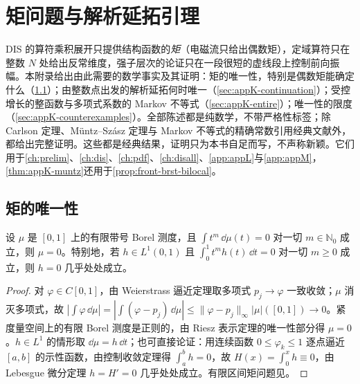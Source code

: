 \chapter{矩问题与解析延拓引理}\label{app:appK}

DIS 的算符乘积展开只提供结构函数的\emph{矩}（电磁流只给出偶数矩），定域算符只在整数 $N$ 处给出反常维度，强子层次的论证只在一段很短的虚线段上控制前向振幅。本附录给出由此需要的数学事实及其证明：矩的唯一性，特别是偶数矩能确定什么（\cref{sec:appK-hausdorff}）；由整数点出发的解析延拓何时唯一（\cref{sec:appK-continuation}）；受控增长的整函数与多项式系数的 Markov 不等式（\cref{sec:appK-entire}）；唯一性的限度（\cref{sec:appK-counterexamples}）。全部陈述都是纯数学，不带严格性标签；除 Carlson 定理、Müntz--Szász 定理与 Markov 不等式的精确常数引用经典文献外，都给出完整证明。这些都是经典结果，证明只为本书自足而写，不声称新颖。它们用于\cref{ch:prelim}、\cref{ch:dis}、\cref{ch:pdf}、\cref{ch:disall}、\cref{app:appL}与\cref{app:appM}，\cref{thm:appK-muntz}还用于\cref{prop:front-brst-bilocal}。

\section{矩的唯一性}\label{sec:appK-hausdorff}

\begin{lemma}\label{lem:appK-hausdorff}
设 $\mu$ 是 $[0,1]$ 上的有限带号 Borel 测度，且 $\int t^m\,\dd\mu(t)=0$ 对一切 $m\in\mathbb N_0$ 成立，则 $\mu=0$。特别地，若 $h\in L^1(0,1)$ 且 $\int_0^1t^mh(t)\,\dd t=0$ 对一切 $m\ge0$ 成立，则 $h=0$ 几乎处处成立。
\end{lemma}

\begin{proof}
对 $\varphi\in C[0,1]$，由 Weierstrass 逼近定理取多项式 $p_j\to\varphi$ 一致收敛；$\mu$ 消灭多项式，故 $|\int\varphi\,\dd\mu|=|\int(\varphi-p_j)\,\dd\mu|\le\|\varphi-p_j\|_\infty|\mu|([0,1])\to0$。紧度量空间上的有限 Borel 测度是正则的，由 Riesz 表示定理的唯一性部分得 $\mu=0$\cite[第~2、6~章]{Rudin1987}。$h\in L^1$ 的情形取 $\dd\mu=h\,\dd t$；也可直接论证：用连续函数 $0\le\varphi_k\le1$ 逐点逼近 $[a,b]$ 的示性函数，由控制收敛定理得 $\int_a^bh=0$，故 $H(x)=\int_0^xh\equiv0$，由 Lebesgue 微分定理 $h=H'=0$ 几乎处处成立\cite[第~7~章]{Rudin1987}。有限区间矩问题见\cite{Hausdorff1921a,Hausdorff1921b,Hausdorff1923}。
\end{proof}


